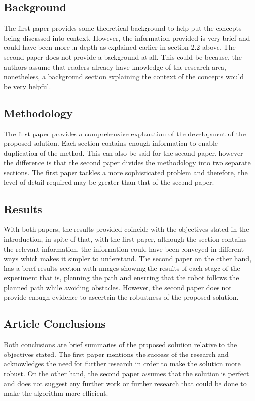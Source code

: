 \documentclass[a4paper, 12pt]{article}
\begin{document}
\subsection{Background} 
The first paper provides some theoretical background to help put the concepts being discussed into context. However, the information provided is very brief and could have been more in depth as explained earlier in section 2.2 above. The second paper does not provide a background at all. This could be because, the authors assume that readers already have knowledge of the research area, nonetheless, a background section explaining the context of the concepts would be very helpful.

\subsection{ Methodology}
The first paper provides a comprehensive explanation of the development of the proposed solution. Each section contains enough information to enable duplication of the method. This can also be said for the second paper, however the difference is that the second paper divides the methodology into two separate sections. The first paper tackles a more sophisticated problem and therefore, the level of detail required may be greater than that of the second paper.

\subsection{Results}
With both papers, the results provided coincide with the objectives stated in the introduction, in spite of that, with the first paper, although the section contains the relevant information, the information could have been conveyed in different ways which makes it simpler to understand. The second paper on the other hand, has a brief results section with images showing the results of each stage of the experiment that is, planning the path and ensuring that the robot follows the planned path while avoiding obstacles. However, the second paper does not provide enough evidence to ascertain the robustness of the proposed solution.

\subsection{ Article Conclusions}
Both conclusions are brief summaries of the proposed solution relative to the objectives stated. The first paper mentions the success of the research and acknowledges the need for further research in order to make the solution more robust. On the other hand, the second paper assumes that the solution is perfect and does not suggest any further work or further research that could be done to make the algorithm more efficient.
\newpage
\end{document}
